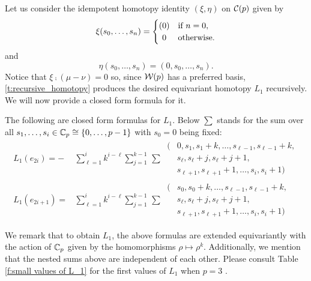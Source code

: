 Let us consider the idempotent homotopy identity $(\xi,\eta)$ on $\mathcal{C}(p)$ given by
\[
\xi({s_0},\dots,{s_n}) =
\begin{cases}
	(0) & \text{if } n = 0, \\
	\hfil0 & \text{otherwise}.
\end{cases}
\]
and
\[
\eta({s_0},\dots,{s_n}) = (0,{s_0},\dots,{s_n}).
\]
Notice that $\xi \comp (\mu - \nu) = 0$ so, since $\mathcal{W}(p)$ has a preferred basis, \cref{t:recursive_homotopy} produces the desired equivariant homotopy $L_1$ recursively.
We will now provide a closed form formula for it.

\begin{lemma*}
	The following are closed form formulas for $L_1$.
	Below $\sum$ stands for the sum over all $s_1,\dots,s_i \in \mathbb{C}_p \cong \{0,\dots,p-1\}$ with $s_0 = 0$ being fixed:
	\begin{align*}
		L_1(e_{2i}) =
		- &\sum_{\ell = 1}^i k^{i-\ell} \sum_{j=1}^{k-1} \, \sum \
		\begin{aligned}
			\big(&0,s_1,s_1+k,\ldots,s_{\ell-1},s_{\ell-1}+k, \\
			&s_{\ell},s_{\ell}+j,s_{\ell}+j+1, \\
			&s_{\ell+1},s_{\ell+1}+1,\ldots,s_i,s_i+1\big)
		\end{aligned} \\[5pt]
		L_1(e_{2i+1}) =
		&\sum_{\ell = 1}^i k^{i-\ell} \sum_{j=1}^{k-1} \, \sum \
		\begin{aligned}
			\big(&s_0,s_0+k,\ldots,s_{\ell-1},s_{\ell-1}+k, \\
			&s_{\ell},s_{\ell}+j,s_{\ell}+j+1, \\
			&s_{\ell+1},s_{\ell+1}+1,\ldots,s_i,s_i+1\big)
		\end{aligned}
	\end{align*}
\end{lemma*}

We remark that to obtain $L_1$, the above formulas are extended equivariantly with the action of $\mathbb{C}_p$ given by the homomorphisms $\rho \mapsto \rho^k$.
Additionally, we mention that the nested sums above are independent of each other.
Please consult Table \ref{f:small values of L_1} for the first values of $L_1$ when $p = 3$ .

